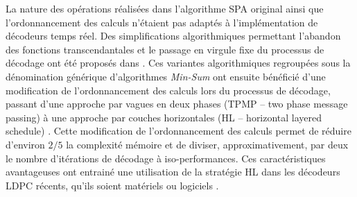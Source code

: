 \documentclass[../main.tex]{subfiles}
\begin{document}
La nature des opérations réalisées dans l’algorithme SPA original \cite{LDPC:SPA} ainsi que l’ordonnancement des calculs n’étaient pas adaptés à l’implémentation de décodeurs temps réel. Des simplifications algorithmiques permettant l’abandon des fonctions transcendantales et le passage en virgule fixe du processus de décodage ont été proposés dans \cite{LDPC:APPROX:1,LDPC:APPROX:2,LDPC:APPROX:3,LDPC:APPROX:4,LDPC:ARCH2}. Ces variantes algorithmiques regroupées sous la dénomination générique d’algorithmes \textit{Min-Sum} ont ensuite bénéficié d’une modification de l’ordonnancement des calculs lors du processus de décodage, passant d’une approche par vagues en deux phases (TPMP – two phase message passing) à une approche par couches horizontales (HL – horizontal layered schedule) \cite{LDPC:HL}. Cette modification de l’ordonnancement des calculs permet de réduire d’environ $\mathit{2/5}$ la complexité mémoire et de diviser, approximativement, par deux le nombre d’itérations de décodage à iso-performances. Ces caractéristiques avantageuses ont entrainé une utilisation de la stratégie HL dans les décodeurs LDPC récents, qu’ils soient matériels \cite{LDPC:APPROX:3,LDPC:APPROX:4,LDPC:ARCH1,LDPC:ARCH2} ou logiciels \cite{LDPC:SOFT1,LDPC:SOFT2,LDPC:SOFT3,LDPC:SOFT4}.
\end{document}
